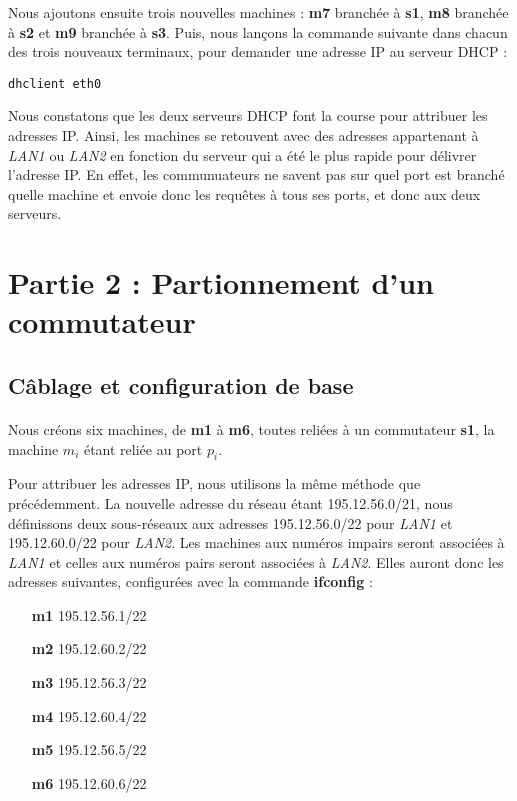 \documentclass{article}
\begin{document}
Nous ajoutons ensuite trois nouvelles machines : \textbf{m7} branchée à \textbf{s1}, \textbf{m8} branchée à \textbf{s2} et \textbf{m9} branchée à \textbf{s3}. Puis, nous lançons la commande suivante dans chacun des trois nouveaux terminaux, pour demander une adresse IP au serveur DHCP :
\begin{verbatim}
dhclient eth0
\end{verbatim}

Nous constatons que les deux serveurs DHCP font la course pour attribuer les adresses IP. Ainsi, les machines se retouvent avec des adresses appartenant à \textit{LAN1} ou \textit{LAN2} en fonction du serveur qui a été le plus rapide pour délivrer l'adresse IP. En effet, les communuateurs ne savent pas sur quel port est branché quelle machine et envoie donc les requêtes à tous ses ports, et donc aux deux serveurs.

\section{Partie 2 : Partionnement d'un commutateur}

\subsection{Câblage et configuration de base}
\paragraph{}{
Nous créons six machines, de \textbf{m1} à \textbf{m6}, toutes reliées à un commutateur \textbf{s1}, la machine \textit{$m_i$} étant reliée au port \textit{$p_i$}. 

Pour attribuer les adresses IP, nous utilisons la même méthode que précédemment. La nouvelle adresse du réseau étant 195.12.56.0/21, nous définissons deux sous-réseaux aux adresses 195.12.56.0/22 pour \textit{LAN1} et 195.12.60.0/22 pour \textit{LAN2}. Les machines aux numéros impairs seront associées à \textit{LAN1} et celles aux numéros pairs seront associées à \textit{LAN2}. Elles auront donc les adresses suivantes, configurées avec la commande \textbf{ifconfig} :
\begin{itemize}
\item[\textbf{m1}] 195.12.56.1/22
\item[\textbf{m2}] 195.12.60.2/22
\item[\textbf{m3}] 195.12.56.3/22
\item[\textbf{m4}] 195.12.60.4/22
\item[\textbf{m5}] 195.12.56.5/22
\item[\textbf{m6}] 195.12.60.6/22
\end{itemize}}
\end{document}
